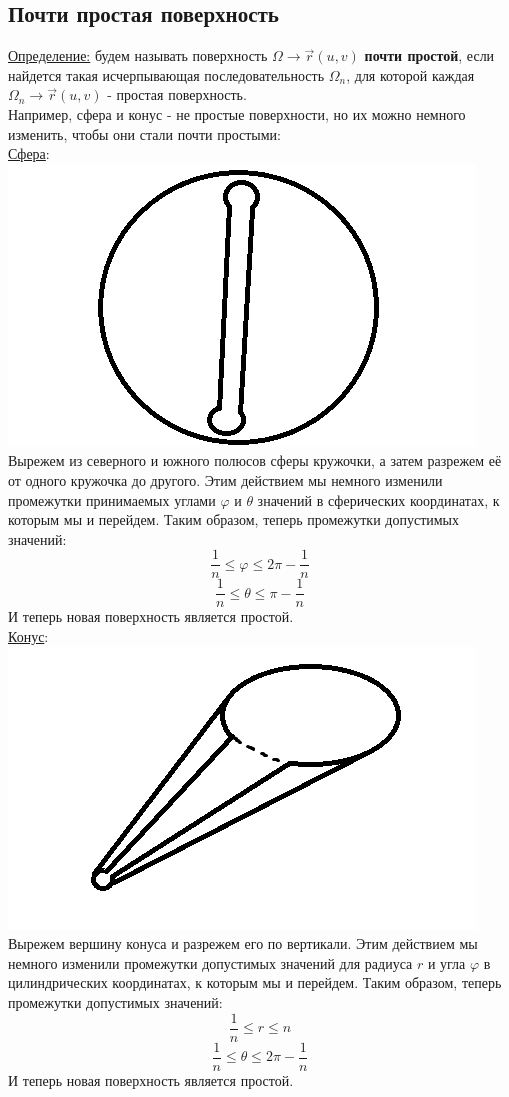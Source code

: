 \documentclass[12pt]{article}
\begin{document}
\subsection{Почти простая поверхность}
\uline{Определение:} будем называть поверхность $\Omega \to \overrightarrow{r}(u,v)$ \textbf{почти простой}, если найдется такая исчерпывающая последовательность $\Omega_n$, для которой  каждая $\Omega_n \to \overrightarrow{r}(u,v)$ - простая поверхность.\\
Например, сфера и конус - не простые поверхности, но их можно немного изменить, чтобы они стали почти простыми:\\
\uline{Сфера}:\\
\includegraphics{sphereNotSimple}\\
Вырежем из северного и южного полюсов сферы кружочки, а затем разрежем её от одного кружочка до другого. Этим действием мы немного изменили промежутки принимаемых углами $\varphi$ и $\theta$ значений в сферических координатах, к которым мы и перейдем. Таким образом, теперь промежутки допустимых значений:\\
$$\frac{1}{n} \leq \varphi \leq 2 \pi - \frac{1}{n}$$
$$\frac{1}{n} \leq \theta \leq \pi - \frac{1}{n}$$
И теперь новая поверхность является простой.\\
\uline{Конус}:\\
\includegraphics{coneNotSimple}\\
Вырежем вершину конуса и разрежем его по вертикали. Этим действием мы немного изменили промежутки допустимых значений для радиуса $r$ и угла $\varphi$ в цилиндрических координатах, к которым мы и перейдем. Таким образом, теперь промежутки допустимых значений:\\
$$\frac{1}{n} \leq r \leq n$$
$$\frac{1}{n} \leq \theta \leq 2 \pi - \frac{1}{n}$$
И теперь новая поверхность является простой.\\
\end{document}
